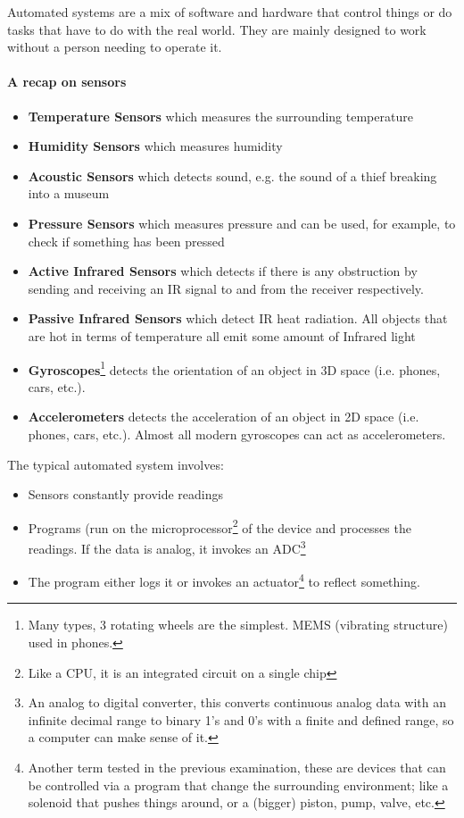 \documentclass[../main.tex]{subfiles}
\begin{document}
Automated systems are a mix of software and hardware that control things or do tasks that have to do with the real world. They are mainly designed to work without a person needing to operate it.

\paragraph{A recap on sensors}

\begin{itemize}
    \item \textbf{Temperature Sensors} which measures the surrounding temperature
    \item \textbf{Humidity Sensors} which measures humidity
    \item \textbf{Acoustic Sensors} which detects sound, e.g. the sound of a thief breaking into a museum
    \item \textbf{Pressure Sensors} which measures pressure and can be used, for example, to check if something has been pressed
    \item \textbf{Active Infrared Sensors} which detects if there is any obstruction by sending and receiving an IR signal to and from the receiver respectively. 
    \item \textbf{Passive Infrared Sensors} which detect IR heat radiation. All objects that are hot in terms of temperature all emit some amount of Infrared light
    \item \textbf{Gyroscopes}\footnote{Many types, 3 rotating wheels are the simplest. MEMS (vibrating structure) used in phones.} detects the orientation of an object in 3D space (i.e. phones, cars, etc.). 
    \item \textbf{Accelerometers} detects the acceleration of an object in 2D space (i.e. phones, cars, etc.). Almost all modern gyroscopes can act as accelerometers.
\end{itemize}

The typical automated system involves:

\begin{itemize}
    \item Sensors constantly provide readings
    \item Programs (run on the microprocessor\footnote{Like a CPU, it is an integrated circuit on a single chip} of the device and processes the readings. If the data is analog, it invokes an ADC\footnote{An analog to digital converter, this converts continuous analog data with an infinite decimal range to binary 1’s and 0’s with a finite and defined range, so a computer can make sense of it.}
    \item The program either logs it or invokes an actuator\footnote{Another term tested in the previous examination, these are devices that can be controlled via a program that change the surrounding environment; like a solenoid that pushes things around, or a (bigger) piston, pump, valve, etc.} to reflect something.
\end{itemize}
\end{document}
